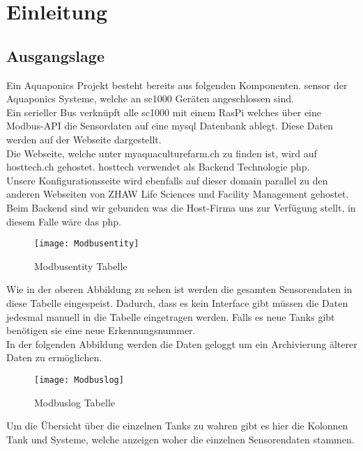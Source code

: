 \documentclass[../main.tex]{subfiles}
\begin{document}
	\section{Einleitung}
	
	\subsection{Ausgangslage}
	Ein Aquaponics Projekt besteht bereits aus folgenden Komponenten. \gls{sensor} der Aquaponics Systeme, welche an \gls{sc1000} Geräten angeschlossen sind. \\
	Ein serieller Bus verknüpft alle \gls{sc1000} mit einem RasPi welches über eine Modbus-API die Sensordaten auf eine \gls{mysql} Datenbank ablegt. Diese Daten werden auf der Webseite dargestellt. \\
	Die Webseite, welche unter myaquaculturefarm.ch zu finden ist, wird auf hosttech.ch gehostet. \gls{hosttech} verwendet als Backend Technologie \gls{php}.\\
	Unsere Konfigurationsseite wird ebenfalls auf dieser \gls{domain} parallel zu den anderen Webseiten von ZHAW Life Sciences und Facility Management gehostet. \\
	Beim Backend sind wir gebunden was die Host-Firma uns zur Verfügung stellt, in diesem Falle wäre das \gls{php}.
	
	\begin{figure}[H]
		\centering
		\texttt{[image: Modbusentity]}
		\caption{Modbusentity Tabelle}
		\label{fig:Modbusentity}
	\end{figure}
	\par \noindent
	Wie in der oberen Abbildung zu sehen ist werden die gesamten Sensorendaten in diese Tabelle eingespeist. Dadurch, dass es kein Interface gibt müssen die Daten jedesmal manuell in die Tabelle eingetragen werden. Falls es neue Tanks gibt benötigen sie eine neue Erkennungsnummer.  \\
	In der folgenden Abbildung werden die Daten geloggt um ein Archivierung älterer Daten zu ermöglichen.
	
	\begin{figure}[H]
		\centering
		\texttt{[image: Modbuslog]}
		\caption{Modbuslog Tabelle}
		\label{fig:Modbuslog}
	\end{figure}
	\par \noindent	
	Um die Übersicht über die einzelnen Tanks zu wahren gibt es hier die Kolonnen Tank und Systeme, welche anzeigen woher die einzelnen Sensorendaten stammen.
	
\end{document}
